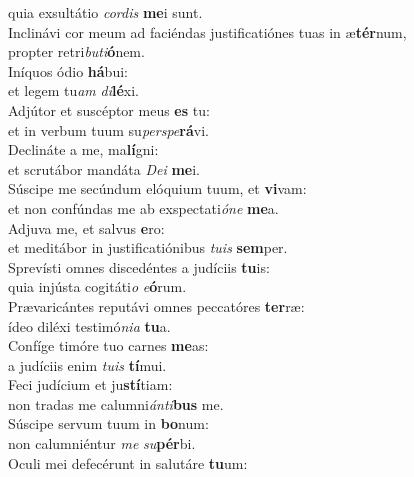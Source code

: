 \oddverse quia exsultátio \textit{cor}\textit{dis} \textbf{me}i sunt.\\
\evenverse Inclinávi cor meum ad faciéndas justificatiónes tuas in æ\textbf{tér}num,~\*\\
\evenverse propter retri\textit{bu}\textit{ti}\textbf{ó}nem.\\
\oddverse Iníquos ódio \textbf{há}bui:~\*\\
\oddverse et legem tu\textit{am} \textit{di}\textbf{lé}xi.\\
\evenverse Adjútor et suscéptor meus \textbf{es} tu:~\*\\
\evenverse et in verbum tuum su\textit{per}\textit{spe}\textbf{rá}vi.\\
\oddverse Declináte a me, ma\textbf{lí}gni:~\*\\
\oddverse et scrutábor mandáta \textit{De}\textit{i} \textbf{me}i.\\
\evenverse Súscipe me secúndum elóquium tuum, et \textbf{vi}vam:~\*\\
\evenverse et non confúndas me ab exspectati\textit{ó}\textit{ne} \textbf{me}a.\\
\oddverse Adjuva me, et salvus \textbf{e}ro:~\*\\
\oddverse et meditábor in justificatiónibus \textit{tu}\textit{is} \textbf{sem}per.\\
\evenverse Sprevísti omnes discedéntes a judíciis \textbf{tu}is:~\*\\
\evenverse quia injústa cogitáti\textit{o} \textit{e}\textbf{ó}rum.\\
\oddverse Prævaricántes reputávi omnes peccatóres \textbf{ter}ræ:~\*\\
\oddverse ídeo diléxi testimó\textit{ni}\textit{a} \textbf{tu}a.\\
\evenverse Confíge timóre tuo carnes \textbf{me}as:~\*\\
\evenverse a judíciis enim \textit{tu}\textit{is} \textbf{tí}mui.\\
\oddverse Feci judícium et ju\textbf{stí}tiam:~\*\\
\oddverse non tradas me calumni\textit{án}\textit{ti}\textbf{bus} me.\\
\evenverse Súscipe servum tuum in \textbf{bo}num:~\*\\
\evenverse non calumniéntur \textit{me} \textit{su}\textbf{pér}bi.\\
\oddverse Oculi mei defecérunt in salutáre \textbf{tu}um:~\*\\
